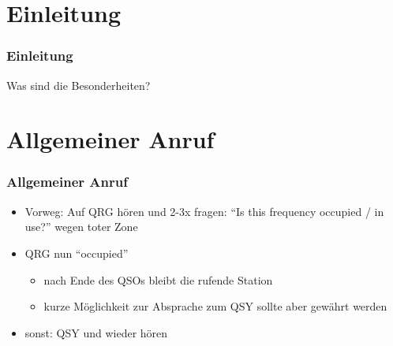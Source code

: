 

\subtitle{Betriebstechnik/Vorschriften 10: \\
          Betriebsabwicklung auf Kurzwelle \\[2em]}
\date{Stand 07.01.2016}


\section{Einleitung}

\begin{frame}
    \frametitle{Einleitung}

    Was sind die Besonderheiten?

\end{frame}

\section{Allgemeiner Anruf}

\begin{frame}
    \frametitle{Allgemeiner Anruf}

    \begin{itemize}
        \item Vorweg: Auf QRG hören und 2-3x fragen: ``Is this frequency occupied /
              in use?'' wegen toter Zone
        \item QRG nun ``occupied''
        \begin{itemize}
            \item nach Ende des QSOs bleibt die rufende Station
            \item kurze Möglichkeit zur Absprache zum QSY sollte aber gewährt werden
        \end{itemize}
        \item sonst: QSY und wieder hören
    \end{itemize}

\end{frame}

